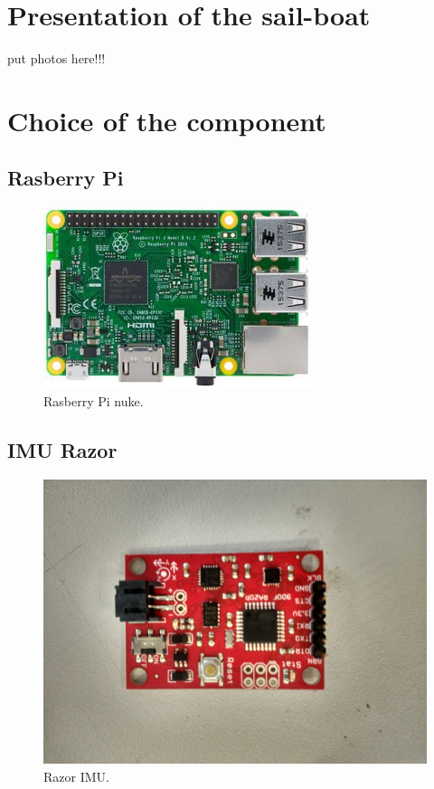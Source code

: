 

\chapter{Presentation of the sail-boat}

put photos here!!!

\chapter{Choice of the component}


\section{Rasberry Pi}

\begin{figure}[H]
\centering
    \includegraphics[scale=0.5,angle=0]{Images/RasberryPy2.jpg}
    \caption{Rasberry Pi nuke.}
    \label{fig:Rasberry}
\end{figure}


\section{IMU Razor}

\begin{figure}[H]
\centering
    \includegraphics[scale=0.05,angle=0]{Images/RazorIMU.jpg}
    \caption{Razor IMU.}
    \label{fig:RazorIMU}
\end{figure}


